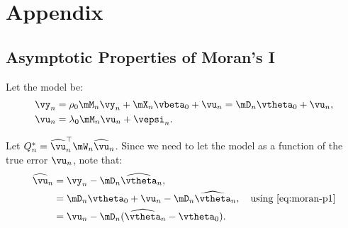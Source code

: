 \documentclass[english,12pt]{book}\usepackage[]{graphicx}\usepackage[]{xcolor}
\begin{document}
\section*{Appendix}


\begin{subappendices}

\section{Asymptotic Properties of Moran's I}\label{Annex:asymptotic-moran-I}


Let the model be:
\begin{equation}\label{eq:moran-p1}
\begin{aligned}
  \vy_n &= \rho_0\mM_n\vy_n + \mX_n\vbeta_0 + \vu_n  =  \mD_n\vtheta_0 + \vu_n, \\
  \vu_n &= \lambda_0\mM_n\vu_n + \vepsi_n.
\end{aligned}
\end{equation}

Let $Q_n^* = \widehat{\vu}_n^\top\mW_n\widehat{\vu}_n$. Since we need to let the model as a function of the true error $\vu_n$, note that:
\begin{equation}\label{eq:moran-p2}
\begin{aligned}
\widehat{\vu}_n & = \vy_n - \mD_n\widehat{\vtheta}_n, \\
& = \mD_n\vtheta_0 + \vu_n -\mD_n\widehat{\vtheta}_n,\quad\mbox{using \eqref{eq:moran-p1}} \\
&= \vu_n - \mD_n(\widehat{\vtheta}_n - \vtheta_0).
\end{aligned}
\end{equation}


\end{subappendices}
\end{document}
